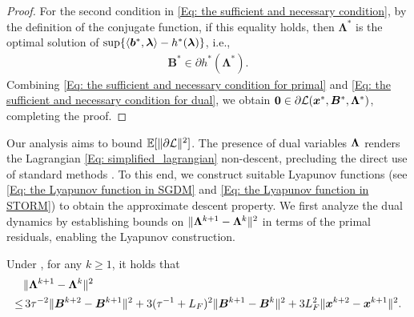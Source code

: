 \begin{proof}
    For the second condition in \eqref{Eq: the sufficient and necessary condition},
    by the definition of the conjugate function, if this equality holds, then $\bm{\Lambda}^{*}$ is the optimal solution of $\sup \{ \left<\bm{b}^{*}, \bm{\lambda}\right> - h^{*}(\bm{\lambda}) \}$, i.e.,
    \begin{align}
        \label{Eq: the sufficient and necessary condition for dual}\bm{B}^{*}\in \partial h^{*}(\bm{\Lambda}^{*}).
    \end{align}
    Combining \eqref{Eq: the sufficient and necessary condition for primal} and \eqref{Eq: the sufficient and necessary condition for dual}, we obtain $\bm{0}\in \partial \mathcal{L}(\bm{x}^{*}, \bm{B}^{*}, \bm{\bm{\Lambda}}^{*})$, completing the proof. 
\end{proof}

Our analysis aims to bound $\mathbb{E}[\|\partial \mathcal{L}\|^2]$. The presence of dual variables $\bm{\Lambda}$ renders the Lagrangian \eqref{Eq: simplified_lagrangian} non-descent, precluding the direct use of standard methods \cite{xu2023momentum,zhang2022stochastic}. 
To this end, we construct suitable Lyapunov functions (see \eqref{Eq: the Lyapunov function in SGDM} and \eqref{Eq: the Lyapunov function in STORM}) to obtain the approximate descent property.  We first analyze the dual dynamics by establishing bounds on $\|\bm{\Lambda}^{k+1}-\bm{\Lambda}^k\|^2$ in terms of the primal residuals, enabling the Lyapunov construction.
\begin{lemma}
\label{Lemma: dual boundedness}
Under , for any $k \geq 1$, it holds that
    \begin{align}
        &\|\bm{\Lambda}^{k+1}- \bm{\Lambda}^k \|^2 \notag \\
        \leq&\,3 \tau^{-2} \|\bm{B}^{k+2} - \bm{B}^{k+1}\|^2 + 3(\tau^{-1} + L_F)^2  \|\bm{B}^{k+1} - \bm{B}^{k}\|^2 + 3L_F^2  \|\bm{x}^{k+2} - \bm{x}^{k+1}\|^2.
         \label{Eq: dual boundedness}
    \end{align}
\end{lemma}

